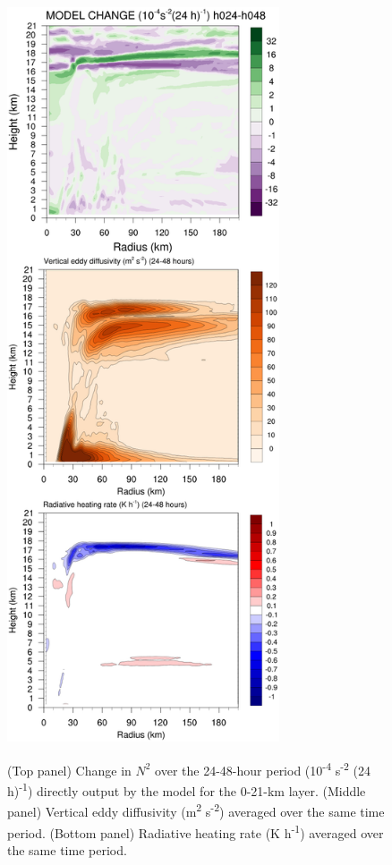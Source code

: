 \documentclass{ametsoc}
\begin{document}
\begin{figure}[ht]
\centerline{\includegraphics[width=19pc]{fulltrop.png}}
\end{figure}
\begin{figure}
\caption{(Top panel) Change in $N^2$ over the 24-48-hour period (10\textsuperscript{-4} s\textsuperscript{-2} (24 h)\textsuperscript{-1}) directly output by the model for the 0-21-km layer. (Middle panel) Vertical eddy diffusivity (m\textsuperscript{2} s\textsuperscript{-2}) averaged over the same time period. (Bottom panel) Radiative heating rate (K h\textsuperscript{-1}) averaged over the same time period.}
\label{fig:fulltrop}
\end{figure}
\end{document}
